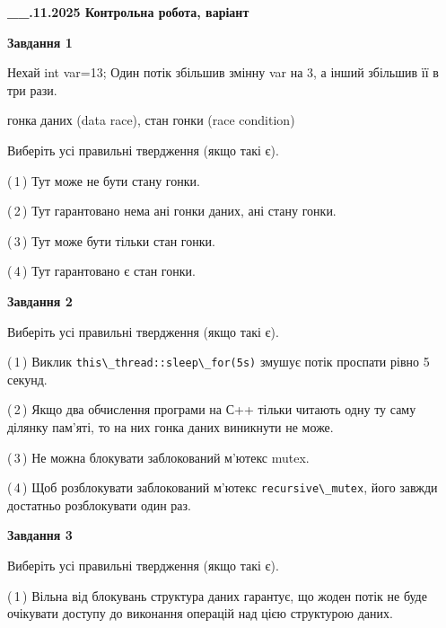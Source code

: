 \documentclass[12pt, ukrainian]{article}
\def\code#1{\Verb!#1!}
\begin{document}
\begin {large}

\textbf{\_\_.11.2025 Контрольна робота, варіант  }\par


{

\begin{center}
\textbf{Завдання 1}
\end{center}
Нехай int var=13; Один потік збільшив змінну var на 3, а інший збільшив її в три рази.

гонка даних (data race), стан гонки (race condition)

Виберіть усі правильні твердження (якщо такі є).\par
\vspace{2mm}
(\,1\,) Тут може не бути стану гонки.%

(\,2\,) Тут гарантовано нема ані гонки даних, ані стану гонки.%

(\,3\,) Тут може бути тільки стан гонки.%

(\,4\,) Тут гарантовано є стан гонки.%



\begin{center}
\textbf{Завдання 2}
\end{center}
Виберіть усі правильні твердження (якщо такі є).\par
\vspace{2mm}

(\,1\,) Виклик \code{this\_thread::sleep\_for(5s)} змушує потік проспати рівно 5 секунд.%

(\,2\,) Якщо два обчислення програми на С++ тільки читають одну ту саму ділянку пам'яті, то на них гонка даних  виникнути не може.%

(\,3\,) Не можна блокувати заблокований м’ютекс mutex.%

(\,4\,) Щоб розблокувати заблокований м’ютекс \code{recursive\_mutex}, його завжди достатньо розблокувати один раз.%



\begin{center}
\textbf{Завдання 3}
\end{center}
Виберіть усі правильні твердження (якщо такі є).\par
\vspace{2mm}

(\,1\,) Вільна від блокувань структура даних гарантує, що жоден потік не буде очікувати доступу до виконання операцій над цією структурою даних.%

}
\end{large}
\end{document}
